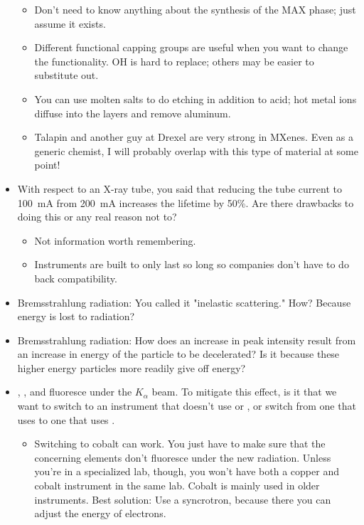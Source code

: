 \documentclass[../notes.tex]{subfiles}
\begin{document}
\begin{itemize}
\begin{itemize}
        \item Don't need to know anything about the synthesis of the MAX phase; just assume it exists.
        \item Different functional capping groups are useful when you want to change the functionality. OH is hard to replace; others may be easier to substitute out.
        \item You can use molten salts to do etching in addition to acid; hot metal ions diffuse into the layers and remove aluminum.
        \item Talapin and another guy at Drexel are very strong in MXenes. Even as a generic chemist, I will probably overlap with this type of material at some point!
    \end{itemize}
    \item With respect to an X-ray tube, you said that reducing the tube current to \SI{100}{\milli\ampere} from \SI{200}{\milli\ampere} increases the lifetime by 50\%. Are there drawbacks to doing this or any real reason not to?
    \begin{itemize}
        \item Not information worth remembering.
        \item Instruments are built to only last so long so companies don't have to do back compatibility.
    \end{itemize}
    \item Bremsstrahlung radiation: You called it "inelastic scattering." How? Because energy is lost to radiation?
    \item Bremsstrahlung radiation: How does an increase in peak intensity result from an increase in energy of the particle to be decelerated? Is it because these higher energy particles more readily give off energy?
    \item {}, , and  fluoresce under the  $K_\alpha$ beam. To mitigate this effect, is it that we want to switch to an instrument that doesn't use  or , or switch from one that uses  to one that uses .
    \begin{itemize}
        \item Switching to cobalt can work. You just have to make sure that the concerning elements don't fluoresce under the new radiation. Unless you're in a specialized lab, though, you won't have both a copper and cobalt instrument in the same lab. Cobalt is mainly used in older instruments. Best solution: Use a syncrotron, because there you can adjust the energy of electrons.

\end{itemize}
\end{itemize}
\end{document}
